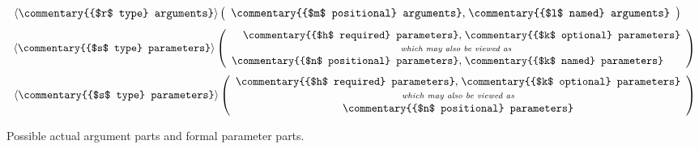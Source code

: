 \documentclass[makeidx]{article}
\begin{document}
{%
%
%
%
\begin{figure}[h]
  \def\A#1{\mbox{\commentary{{#1} arguments}}}
  \def\P#1{\mbox{\commentary{{#1} parameters}}}
  \begin{displaymath}
    \begin{array}{rl}
      \left<\A{$r$ type}\right>
      \left(
      \begin{array}{r@{,\;}l}
        \A{$m$ positional}&\A{$l$ named}
      \end{array}
      \right)
    \end{array}
  \end{displaymath}
  \begin{displaymath}
    \begin{array}{rl}
      \left<\P{$s$ type}\right>
      \left(
      \begin{array}{r@{,\;}l}
        \P{$h$ required}&\P{$k$ optional}\\
        \multicolumn{2}{c}{\mbox{\scriptsize\textit{which may also be viewed as}}}\\
        \P{$n$ positional}&\P{$k$ named}\\
      \end{array}
      \right)
    \end{array}
  \end{displaymath}
  \begin{displaymath}
    \begin{array}{rl}
      \left<\P{$s$ type}\right>
      \left(
      \begin{array}{r@{,\;}l}
        \P{$h$ required}&\P{$k$ optional}\\
        \multicolumn{2}{c}{\mbox{\scriptsize\textit{which may also be viewed as}}}\\
        \multicolumn{2}{c}{\P{$n$ positional}}
      \end{array}
      \right)
    \end{array}
  \end{displaymath}
  \caption{Possible actual argument parts and formal parameter parts.}
  \label{fig:argumentsAndParameters}
\end{figure}

}
\end{document}
